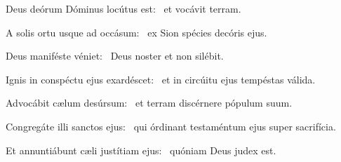 \item Deus deórum Dóminus locútus est:~\psstar{} et vocávit terram.

\item A solis ortu usque ad occásum:~\psstar{} ex Sion spécies decóris ejus.

\item Deus maniféste véniet:~\psstar{} Deus noster et non silébit.

\item Ignis in conspéctu ejus exardéscet:~\psstar{} et in circúitu ejus tempéstas válida.

\item Advocábit cælum desúrsum:~\psstar{} et terram discérnere pópulum suum.

\item Congregáte illi sanctos ejus:~\psstar{} qui órdinant testaméntum ejus super sacrifícia.

\item Et annuntiábunt cæli justítiam ejus:~\psstar{} quóniam Deus judex est.
